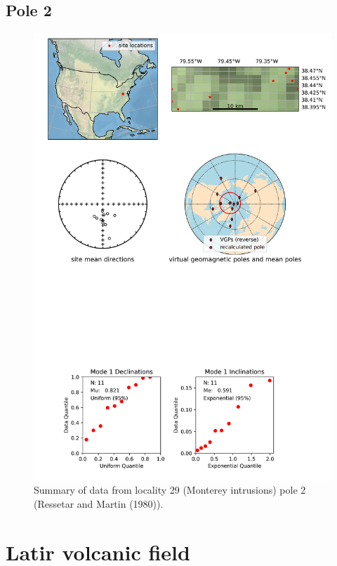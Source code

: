 \subsection{Pole 2}


\begin{figure}[H]
\centering
\includegraphics[width=5 in]{./29/2/pole_summary.png}
\caption{Summary of data from locality 29 (Monterey intrusions) pole 2 (Ressetar and Martin (1980)).}
\end{figure}

\section{Latir volcanic field}
